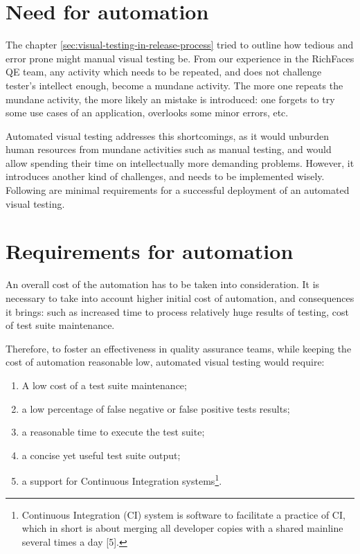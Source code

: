 \documentclass[11pt,oneside,final]{fithesis2}
\begin{document}
  \section{Need for automation}
  The chapter \ref{sec:visual-testing-in-release-process} tried to outline how tedious and error prone might manual visual testing be. From our experience in the RichFaces QE team, any activity
  which needs to be repeated, and does not challenge tester's intellect enough, become a mundane activity. The more one repeats the mundane activity, the more likely an mistake is introduced:
  one forgets to try some use cases of an application, overlooks some minor errors, etc.
  
  Automated visual testing addresses this shortcomings, as it would unburden human resources from mundane activities such as manual testing, and would allow spending their
  time on intellectually more demanding problems. However, it introduces another kind of challenges, and needs to be implemented wisely. Following are minimal requirements 
  for a successful deployment of an automated visual testing.
      
  \section{Requirements for automation}
  \label{sec:requirementsForAutomation}
  An overall cost of the automation has to be taken into consideration. It is necessary to take into account higher initial cost of automation, and consequences it brings: 
  such as increased time to process relatively huge results of testing, cost of test suite maintenance.
  
  Therefore, to foster an effectiveness in quality assurance teams, while keeping the cost of automation reasonable low, automated visual testing would require:
  \begin{enumerate}
   \item A low cost of a test suite maintenance;
   \item a low percentage of false negative or false positive tests results;
   \item a reasonable time to execute the test suite;
   \item a concise yet useful test suite output;
   \item a support for Continuous Integration systems\footnote{Continuous Integration (CI) system is software to facilitate a practice of CI, which in short is about merging 
	  all developer copies with a shared mainline several times a day [5].}.
  \end{enumerate}
  
\end{document}
